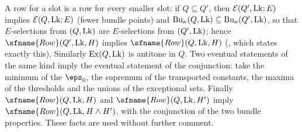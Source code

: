A row for a slot is a row for every smaller slot: if $Q\subseteq Q'$, then $\mathcal{E}(Q',\mathrm{Lk};E)$ implies
$\mathcal{E}(Q,\mathrm{Lk};E)$ (fewer bundle points) and $\mathrm{Bu}_\kappa(Q,\mathrm{Lk})\subseteq\mathrm{Bu}_\kappa(Q',\mathrm{Lk})$, so that
$E$-selections from $(Q,\mathrm{Lk})$ are $E$-selections from $(Q',\mathrm{Lk})$; hence $\sfname{Row}(Q',\stageULk,H)$ implies
$\sfname{Row}(Q,\stageULk,H)$ (, which states exactly this). Similarly
$\mathrm{Ex}(Q,\mathrm{Lk})$ is antitone in $Q$. Two eventual statements of the same kind imply the eventual statement of the
conjunction: take the minimum of the $\eps_0$, the supremum of the transported constants, the maxima of the thresholds
and the unions of the exceptional sets. Finally $\sfname{Row}(Q,\stageULk,H)$ and $\sfname{Row}(Q,\stageULk,H')$ imply
$\sfname{Row}(Q,\stageULk,H\wedge H')$, with the conjunction of the two bundle properties. These facts are used without
further comment.

